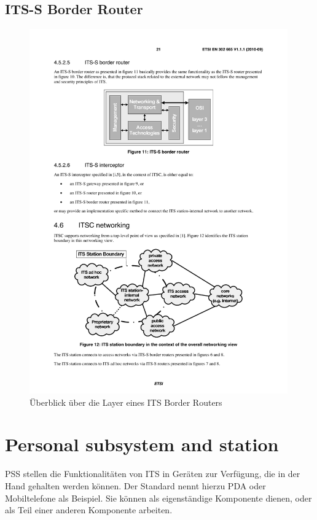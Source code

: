\subsection{ITS-S Border Router}
\begin{figure}
\includegraphics[width=0.99\textwidth]{content/images/01_funktionsweise/layer_borderRouter.pdf}
\caption{Überblick über die Layer eines ITS Border Routers \cite{etsi2010302}}
\label{fig:funktionsweise_borderRouter}
\end{figure}

\section{Personal subsystem and station}
\ac{PSS} stellen die Funktionalitäten von \ac{ITS} in Geräten zur Verfügung, die in der Hand gehalten werden können. Der Standard nennt hierzu \ac{PDA} oder Mobiltelefone als Beispiel. Sie können als eigenständige Komponente dienen, oder als Teil einer anderen Komponente arbeiten.

